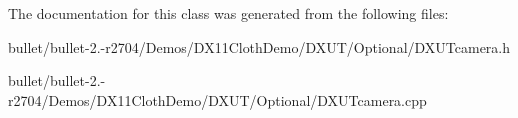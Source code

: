 The documentation for this class was generated from the following files\+:\begin{DoxyCompactItemize}
\item 
bullet/bullet-\/2.-\/r2704/\+Demos/\+D\+X11\+Cloth\+Demo/\+D\+X\+U\+T/\+Optional/D\+X\+U\+Tcamera.\+h\item 
bullet/bullet-\/2.-\/r2704/\+Demos/\+D\+X11\+Cloth\+Demo/\+D\+X\+U\+T/\+Optional/D\+X\+U\+Tcamera.\+cpp\end{DoxyCompactItemize}
